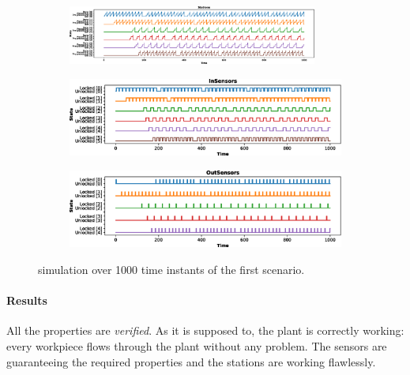 \documentclass[a4paper,twoside]{article}
\begin{document}
    \begin{figure}[h!]
        \begin{subfigure}{\textwidth}
            \centering
            \includegraphics[width=0.9\textwidth]{images/scenarios/scenario1_stations}
        \end{subfigure}
        \begin{subfigure}{0.49\textwidth}
            \centering
            \includegraphics[width=\textwidth]{images/scenarios/scenario1_insensors}
        \end{subfigure}
        \hfill
        \begin{subfigure}{0.49\textwidth}
            \centering
            \includegraphics[width=\textwidth]{images/scenarios/scenario1_outsensors}
        \end{subfigure}
        \caption{simulation over 1000 time instants of the first scenario.}
        \label{figure:scenario:1}
    \end{figure}

    \paragraph{Results} All the properties are \textit{verified}. As it is supposed to, the plant is correctly working: every workpiece flows through the plant without any problem. The sensors are guaranteeing the required properties and the stations are working flawlessly.
\end{document}
